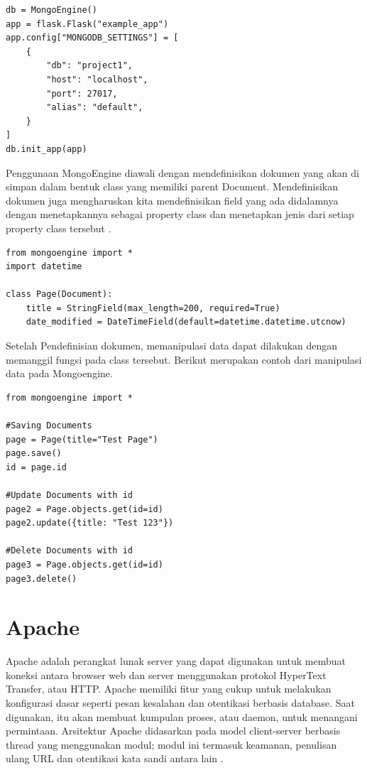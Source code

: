 \begin{enumerate}[a.]
\begin{lstlisting}
db = MongoEngine()
app = flask.Flask("example_app")
app.config["MONGODB_SETTINGS"] = [
    {
        "db": "project1",
        "host": "localhost",
        "port": 27017,
        "alias": "default",
    }
]
db.init_app(app)
\end{lstlisting}

		Penggunaan MongoEngine diawali dengan mendefinisikan dokumen yang akan di simpan dalam bentuk class yang memiliki parent Document. Mendefinisikan dokumen juga mengharuskan kita mendefinisikan field yang ada didalamnya dengan menetapkannya sebagai property class dan menetapkan jenis dari setiap property class tersebut \citep{rosslawley2020mongoeingedocumentation}.
\begin{lstlisting}
from mongoengine import *
import datetime

class Page(Document):
    title = StringField(max_length=200, required=True)
    date_modified = DateTimeField(default=datetime.datetime.utcnow)
\end{lstlisting}

		Setelah Pendefinisian dokumen, memanipulasi data dapat dilakukan dengan memanggil fungsi pada class tersebut. Berikut merupakan contoh dari manipulasi data pada Mongoengine.
		
\begin{lstlisting}
from mongoengine import *

#Saving Documents
page = Page(title="Test Page")
page.save()
id = page.id

#Update Documents with id
page2 = Page.objects.get(id=id)
page2.update({title: "Test 123"})

#Delete Documents with id
page3 = Page.objects.get(id=id)
page3.delete()

\end{lstlisting}
		
	\end{enumerate}
	
		

\section{Apache}
	
	Apache adalah perangkat lunak server yang dapat digunakan untuk membuat koneksi antara browser web dan server menggunakan protokol HyperText Transfer, atau HTTP. Apache memiliki fitur yang cukup untuk melakukan konfigurasi dasar seperti pesan kesalahan dan otentikasi berbasis database. Saat digunakan, itu akan membuat kumpulan proses, atau daemon, untuk menangani permintaan. Arsitektur Apache didasarkan pada model client-server berbasis thread yang menggunakan modul; modul ini termasuk keamanan, penulisan ulang URL dan otentikasi kata sandi antara lain \citep{apachehttpserver2022}.

